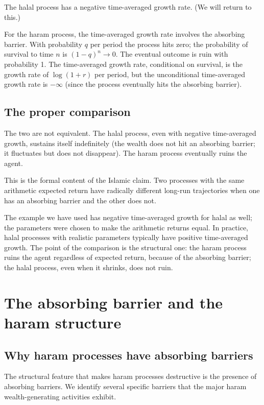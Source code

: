 The halal process has a negative time-averaged growth rate. (We will
return to this.)

For the haram process, the time-averaged growth rate involves the
absorbing barrier. With probability $q$ per period the process
hits zero; the probability of survival to time $n$ is $(1-q)^n
\to 0$. The eventual outcome is ruin with probability 1. The
time-averaged growth rate, conditional on survival, is the growth
rate of $\log(1+r)$ per period, but the unconditional time-averaged
growth rate is $-\infty$ (since the process eventually hits the
absorbing barrier).

\subsection{The proper comparison}

The two are not equivalent. The halal process, even with negative
time-averaged growth, sustains itself indefinitely (the wealth
does not hit an absorbing barrier; it fluctuates but does not
disappear). The haram process eventually ruins the agent.

This is the formal content of the Islamic claim. Two processes
with the same arithmetic expected return have radically different
long-run trajectories when one has an absorbing barrier and the
other does not.

The example we have used has negative time-averaged growth for
halal as well; the parameters were chosen to make the arithmetic
returns equal. In practice, halal processes with realistic
parameters typically have positive time-averaged growth. The point
of the comparison is the structural one: the haram process ruins
the agent regardless of expected return, because of the absorbing
barrier; the halal process, even when it shrinks, does not ruin.

\section{The absorbing barrier and the haram structure}
\label{sec:halal-absorbing}

\subsection{Why haram processes have absorbing barriers}

The structural feature that makes haram processes destructive is
the presence of absorbing barriers. We identify several specific
barriers that the major haram wealth-generating activities exhibit.

